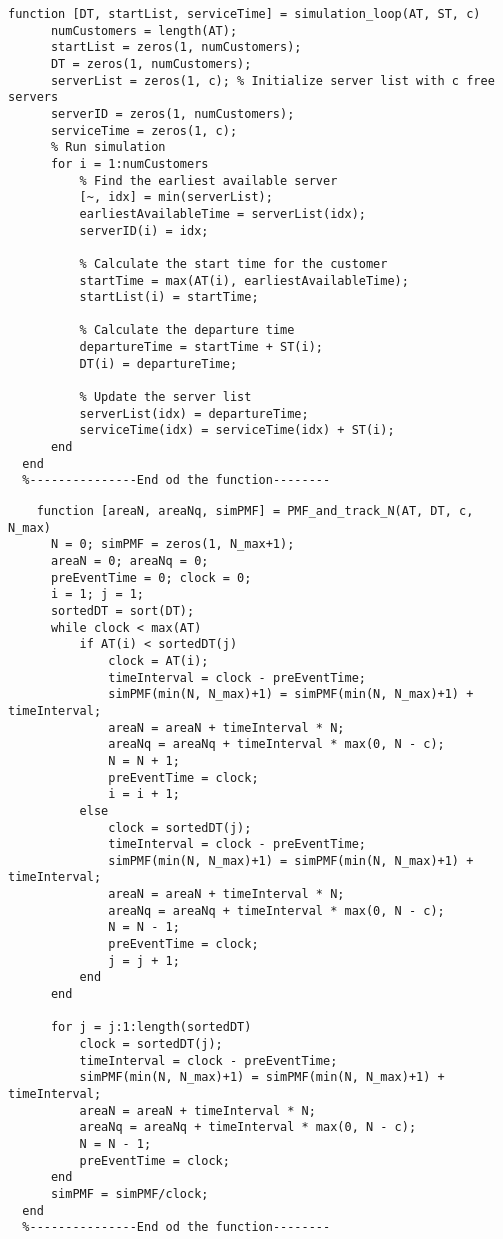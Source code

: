 \begin{lstlisting}[style=Matlab-editor, basicstyle=\ttfamily\footnotesize]
    function [DT, startList, serviceTime] = simulation_loop(AT, ST, c)
      numCustomers = length(AT);
      startList = zeros(1, numCustomers);
      DT = zeros(1, numCustomers);
      serverList = zeros(1, c); % Initialize server list with c free servers
      serverID = zeros(1, numCustomers);
      serviceTime = zeros(1, c);
      % Run simulation
      for i = 1:numCustomers
          % Find the earliest available server
          [~, idx] = min(serverList);
          earliestAvailableTime = serverList(idx);
          serverID(i) = idx;
          
          % Calculate the start time for the customer
          startTime = max(AT(i), earliestAvailableTime);
          startList(i) = startTime;
          
          % Calculate the departure time
          departureTime = startTime + ST(i);
          DT(i) = departureTime;
          
          % Update the server list
          serverList(idx) = departureTime;
          serviceTime(idx) = serviceTime(idx) + ST(i); 
      end
  end
  %---------------End od the function--------
  \end{lstlisting}
  
  \begin{lstlisting}[style=Matlab-editor, basicstyle=\ttfamily\footnotesize]
    %----------E[N], E[Nq], and PMF of N(t)-------------
    function [areaN, areaNq, simPMF] = PMF_and_track_N(AT, DT, c, N_max)
      N = 0; simPMF = zeros(1, N_max+1);
      areaN = 0; areaNq = 0;
      preEventTime = 0; clock = 0;
      i = 1; j = 1;
      sortedDT = sort(DT);
      while clock < max(AT)
          if AT(i) < sortedDT(j)
              clock = AT(i);
              timeInterval = clock - preEventTime;
              simPMF(min(N, N_max)+1) = simPMF(min(N, N_max)+1) + timeInterval;
              areaN = areaN + timeInterval * N;
              areaNq = areaNq + timeInterval * max(0, N - c);
              N = N + 1;
              preEventTime = clock;
              i = i + 1;
          else
              clock = sortedDT(j);
              timeInterval = clock - preEventTime;
              simPMF(min(N, N_max)+1) = simPMF(min(N, N_max)+1) + timeInterval;
              areaN = areaN + timeInterval * N;
              areaNq = areaNq + timeInterval * max(0, N - c);
              N = N - 1;
              preEventTime = clock;
              j = j + 1;
          end
      end
  
      for j = j:1:length(sortedDT)
          clock = sortedDT(j);
          timeInterval = clock - preEventTime;
          simPMF(min(N, N_max)+1) = simPMF(min(N, N_max)+1) + timeInterval;
          areaN = areaN + timeInterval * N;
          areaNq = areaNq + timeInterval * max(0, N - c);
          N = N - 1;
          preEventTime = clock;
      end 
      simPMF = simPMF/clock;
  end
  %---------------End od the function--------
  \end{lstlisting}
  
